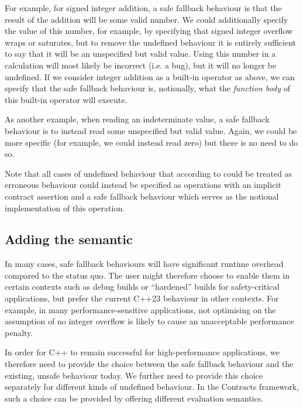 For example, for signed integer addition, a safe fallback behaviour is that the result of the  addition  will be some valid number. We could additionally specify the value of this number, for example, by specifying that signed integer overflow wraps or saturates, but to remove the undefined behaviour it is entirely sufficient to say that it will be an unspecified but valid value. Using this number in a calculation will most likely be incorrect (i.e. a bug), but it will no longer be undefined. If we consider integer addition as a built-in operator as above, we can specify that the safe fallback behaviour is, notionally, what the \emph{function body} of this built-in operator will execute.

As another example, when reading an indeterminate value, a safe fallback behaviour is to instead read some unspecified but valid value. Again, we could be more specific (for example, we could instead read zero) but there is no need to do so.

Note that all cases of undefined behaviour that according to \cite{P2795R5} could be treated as erroneous behaviour could instead be specified as operations with an implicit contract assertion and a safe fallback behaviour which serves as the notional implementation of this operation.

\subsection{Adding the  semantic}

In many cases, safe fallback behaviours will have significant runtime overhead compared to the status quo. The user might therefore choose to enable them in certain contexts such as debug builds or ``hardened'' builds for safety-critical applications, but prefer the current C++23 behaviour in other contexts. For example, in many performance-sensitive applications, not optimising on the assumption of no integer overflow is likely to cause an unacceptable performance penalty. 

In order for C++ to remain successful for high-performance applications, we therefore need to provide the choice between the safe fallback behaviour and the existing, unsafe behaviour today. We further need to provide this choice separately for different kinds of undefined behaviour. In the Contracts framework, such a choice can be provided by offering different evaluation semantics.

